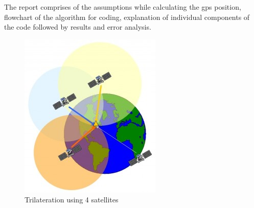 \documentclass[conference,compsoc]{IEEEtran}
\begin{document}
The report comprises of the assumptions while calculating the gps position, flowchart of the algorithm for coding, explanation of individual components of the code followed by results and error analysis.

\begin{figure}[b]
	\centering
	\includegraphics[scale = 0.3]{images/trilateration.jpg}
	\caption{Trilateration using 4 satellites \cite{I1}}
\end{figure}




%
%
\end{document}
